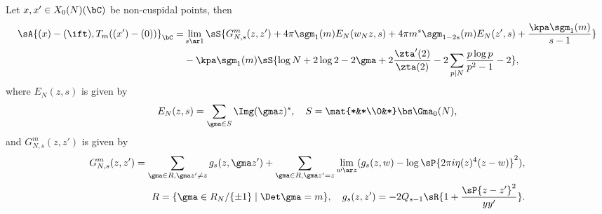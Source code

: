 \documentclass[article, a4paper, twoside]{universal}
\begin{document}
\begin{thm}[{\cite[II.2.23, II.5.7]{GZ1986}}]\label{thm:overC}
	Let $x,x'\in X_{0}(N)(\bC)$ be non-cuspidal points, then
	\begin{align*}
		\sA{(x)-(\ift),T_{m}((x')-(0))}_{\bC}=&\lim_{s\ar 1}\sS{G_{N,s}^{m}(z,z')+4\pi\sgm_{1}(m)E_{N}(w_{N}z,s)+4\pi m^{s}\sgm_{1-2s}(m)E_{N}(z',s)+\frac{\kpa\sgm_{1}(m)}{s-1}}\\
	  &-\kpa\sgm_{1}(m)\sS{\log N+2\log 2-2\gma+2\frac{\zta'(2)}{\zta(2)}-2\sum_{p\mid N}\frac{p\log p}{p^{2}-1}-2},
	\end{align*}
	where $E_{N}(z,s)$ is given by
	\[
		E_{N}(z,s) = \sum_{\gma\in S}\Img(\gma z)^{s},\quad S=\mat{*&*\\0&*}\bs\Gma_{0}(N),
	\]
	and $G_{N,s}^{m}(z,z')$ is given by
	\begin{align*}
	  G_{N,s}^{m}(z,z') = \sum\limits_{\gma\in R, \gma z'\neq z}g_{s}(z,\gma z') +\sum\limits_{\gma\in R, \gma z'=z}\lim\limits_{w\ar z}(g_{s}(z,w)-\log\sP{2\pi i\eta(z)^{4}(z-w)}^{2}),\\
	  R=\{\gma\in R_{N}/\{\pm1\}\mid \Det\gma=m\},\quad g_{s}(z,z')=-2Q_{s-1}\sR{1+\frac{\sP{z-z'}^{2}}{yy'}}.
	\end{align*}
\end{thm}
\end{document}
